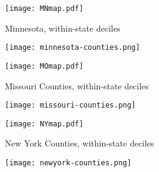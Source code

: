 \documentclass[10pt]{article}
\begin{document}
\begin{figure} 
  \begin{center}
    \caption{Minnesota, within-state deciles}
    \texttt{[image: MNmap.pdf]}
  \end{center}
\end{figure}

\begin{figure} 
  \begin{center}
    \texttt{[image: minnesota-counties.png]}
  \end{center}
\end{figure}

\begin{landscape}

\end{landscape}

\begin{figure} 
  \begin{center}
    \caption{Missouri Counties, within-state deciles}
    \texttt{[image: MOmap.pdf]}
  \end{center}
\end{figure}

\begin{figure} 
  \begin{center}
    \texttt{[image: missouri-counties.png]}
  \end{center}
\end{figure}

\begin{landscape}

\end{landscape}

\begin{landscape}
\begin{figure} 
  \begin{center}
    \caption{New York Counties, within-state deciles}
    \texttt{[image: NYmap.pdf]}
  \end{center}
\end{figure}
\end{landscape}

\begin{landscape}
\begin{figure} 
  \begin{center}
    \texttt{[image: newyork-counties.png]}
  \end{center}
\end{figure}
\end{landscape}

\begin{landscape}

\end{landscape}
\end{document}
